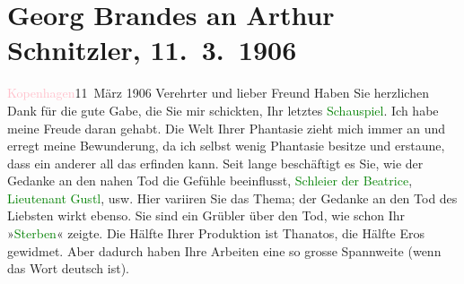 

               \section[Georg Brandes an Arthur Schnitzler, 11. 3. 1906]{ Georg Brandes an Arthur Schnitzler, 11. 3. 1906}\nopagebreak{}\rehead{ }\normalsize\beginnumbering{} \toendnotes[C]{\smallbreak\pagebreak[2]} 
\toendnotes[C]{\smallbreak}\pstart
           \raggedleft{}{\pb}\textcolor{pink}{Kopenhagen}{}\ledrightnote{\textcolor{pink}{Kopenhagen}}{ }11 März 1906\pend
           \pstart{}Verehrter und lieber Freund\pend\pstart
           Haben Sie herzlichen Dank für die gute Gabe, die Sie mir schickten, Ihr letztes \textcolor{green}{Schauspiel}{}. Ich habe meine Freude
               daran gehabt. Die Welt Ihrer Phantasie zieht mich immer an und erregt meine
               Bewunderung, da ich selbst wenig Phantasie besitze und erstaune, dass ein anderer all
               das erfinden kann.\pend
           \pstart
           Seit lange beschäftigt es Sie, wie der Gedanke an den nahen Tod die Gefühle
               beeinflusst, \textcolor{green}{Schleier der Beatrice}{}\ledrightnote{\textcolor{green}{Der Schleier der Beatrice. Schauspiel in fünf Akten}}, \textcolor{green}{Lieutenant Gustl}{}\ledrightnote{\textcolor{green}{Lieutenant Gustl. Novelle}}, usw. Hier variiren Sie das Thema;
               der Gedanke an den Tod des Liebsten wirkt ebenso. Sie sind ein Grübler über den Tod,
               wie schon Ihr »\textcolor{green}{Sterben}{}\ledrightnote{\textcolor{green}{Sterben. Novelle}}« zeigte. Die Hälfte {\pb}Ihrer Produktion ist Thanatos, die
               Hälfte Eros gewidmet. Aber dadurch haben Ihre Arbeiten eine so grosse Spannweite
               (wenn das Wort deutsch ist).\pend
           \pstart
